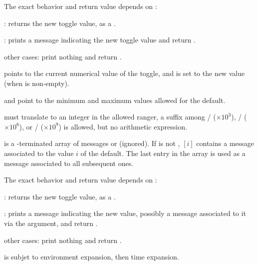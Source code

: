 The exact behavior and return value depends on :

\item {}: returns the new toggle value, as a .

\item {}: prints a message indicating the new toggle value
and return .

\item other cases: print nothing and return .



\item {} points to the current numerical value of the toggle, and is set
to the new value (when  is non-empty).

\item {} and  point to the minimum and maximum values allowed
for the default.

\item {} must translate to an integer in the allowed ranger, a suffix
among
/ ($\times 10^3$),
/ ($\times 10^6$),
or
/ ($\times 10^9$) is allowed, but no arithmetic expression.

\item {} is a \kbd[NULL]-terminated array of messages or 
(ignored). If  is not , $[i]$ contains
a message associated to the value $i$ of the default. The last entry in the
 array is used as a message associated to all subsequent ones.

The exact behavior and return value depends on :

\item {}: returns the new toggle value, as a .

\item {}: prints a message indicating the new value,
possibly a message associated to it via the  argument, and return
.

\item other cases: print nothing and return .

\item {} is subjet to environment expansion, then time expansion.

